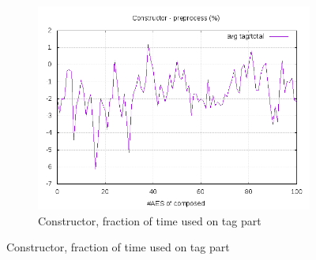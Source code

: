 \documentclass[10pt,a4paper]{article}
\begin{document}
\begin{figure}[h]
\begin{subfigure}[t]{0.3\textwidth}
        \includegraphics[width=\textwidth]{const_preprocess_frac}
        \caption{Constructor, fraction of time used on tag part}
    \end{subfigure}


\end{figure}
\end{document}
